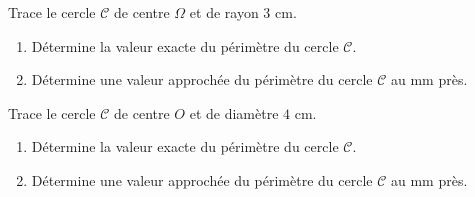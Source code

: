 \begin{pageCours}
% 

\end{pageCours} 
\begin{pageAD} 


\begin{minipage}{.38\linewidth}
 
Trace le cercle $\mathcal{C}$ de centre $\Omega$ et de rayon $3$ cm.



 \end{minipage}
 \hfill
 \begin{minipage}{.58\linewidth}
\begin{enumerate}
\item Détermine la valeur exacte du périmètre du cercle $\mathcal{C}$. 
\item Détermine une valeur approchée du périmètre du cercle $\mathcal{C}$ au mm près. 
 \end{enumerate}  
 \end{minipage}
 

\begin{minipage}{.38\linewidth}
 
Trace le cercle $\mathcal{C}$ de centre $O$ et de diamètre $4$ cm.



 \end{minipage}
 \hfill
 \begin{minipage}{.58\linewidth}
\begin{enumerate}
\item Détermine la valeur exacte du périmètre du cercle $\mathcal{C}$. 
\item Détermine une valeur approchée du périmètre du cercle $\mathcal{C}$ au mm près. 
 \end{enumerate}  
 \end{minipage}
 


\end{pageAD}
